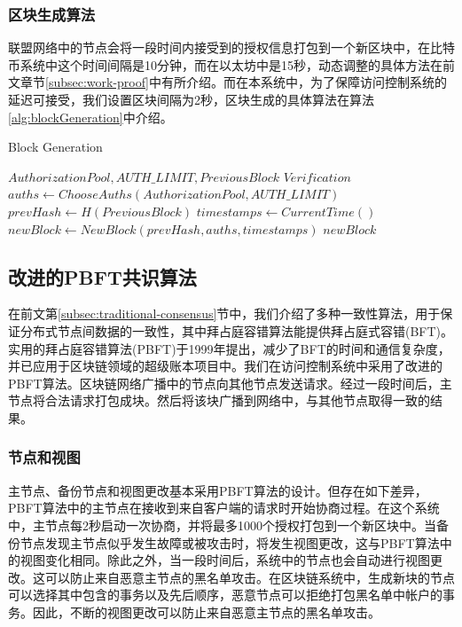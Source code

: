 \subsubsection{区块生成算法}

联盟网络中的节点会将一段时间内接受到的授权信息打包到一个新区块中，在比特币系统中这个时间间隔是10分钟，而在以太坊中是15秒，动态调整的具体方法在前文章节\ref{subsec:work-proof}中有所介绍。而在本系统中，为了保障访问控制系统的延迟可接受，我们设置区块间隔为2秒，区块生成的具体算法在算法\ref{alg:blockGeneration}中介绍。

 \begin{algorithm}
 \caption{Block Generation}\label{alg:blockGeneration}
   \begin{algorithmic}[!htbp]
   \renewcommand{\algorithmicrequire}{\textbf{Input:}}
   \renewcommand{\algorithmicensure}{\textbf{Output:}}
   \REQUIRE $AuthorizationPool, AUTH\_LIMIT, PreviousBlock$
   \ENSURE  $Verification$
    \STATE $auths \gets ChooseAuths(AuthorizationPool, AUTH\_LIMIT)$
    \STATE $prevHash \gets H(PreviousBlock)$
    \STATE $timestamps \gets CurrentTime()$
    \STATE $newBlock \gets NewBlock(prevHash, auths, timestamps)$
   \RETURN $newBlock$
   \end{algorithmic}
 \end{algorithm}

\subsection{改进的PBFT共识算法}

在前文第\ref{subsec:traditional-consensus}节中，我们介绍了多种一致性算法，用于保证分布式节点间数据的一致性，其中拜占庭容错算法能提供拜占庭式容错(BFT)。实用的拜占庭容错算法(PBFT)于1999年提出，减少了BFT的时间和通信复杂度，并已应用于区块链领域的超级账本项目中。我们在访问控制系统中采用了改进的PBFT算法。区块链网络广播中的节点向其他节点发送请求。经过一段时间后，主节点将合法请求打包成块。然后将该块广播到网络中，与其他节点取得一致的结果。

\subsubsection{节点和视图}

主节点、备份节点和视图更改基本采用PBFT算法的设计。但存在如下差异，PBFT算法中的主节点在接收到来自客户端的请求时开始协商过程。在这个系统中，主节点每2秒启动一次协商，并将最多1000个授权打包到一个新区块中。当备份节点发现主节点似乎发生故障或被攻击时，将发生视图更改，这与PBFT算法中的视图变化相同。除此之外，当一段时间后，系统中的节点也会自动进行视图更改。这可以防止来自恶意主节点的黑名单攻击。在区块链系统中，生成新块的节点可以选择其中包含的事务以及先后顺序，恶意节点可以拒绝打包黑名单中帐户的事务。因此，不断的视图更改可以防止来自恶意主节点的黑名单攻击。

